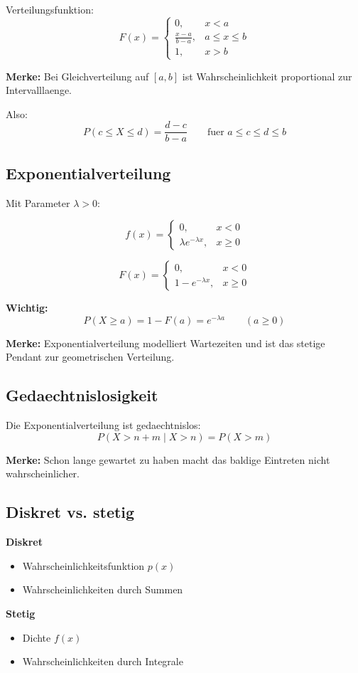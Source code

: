 \documentclass[a4paper,11pt]{article}
\begin{document}
Verteilungsfunktion:
\[
F(x)=
\begin{cases}
0,& x<a \\
\frac{x-a}{b-a},& a\le x\le b \\
1,& x>b
\end{cases}
\]

\textbf{Merke:}
Bei Gleichverteilung auf $[a,b]$ ist Wahrscheinlichkeit proportional zur Intervalllaenge.

Also:
\[
P(c\le X\le d)=\frac{d-c}{b-a}
\qquad \text{fuer } a\le c\le d\le b
\]

\subsection{Exponentialverteilung}
Mit Parameter $\lambda>0$:

\[
f(x)=
\begin{cases}
0,& x<0 \\
\lambda e^{-\lambda x},& x\ge 0
\end{cases}
\]

\[
F(x)=
\begin{cases}
0,& x<0 \\
1-e^{-\lambda x},& x\ge 0
\end{cases}
\]

\textbf{Wichtig:}
\[
P(X\ge a)=1-F(a)=e^{-\lambda a}
\qquad (a\ge 0)
\]

\textbf{Merke:}
Exponentialverteilung modelliert Wartezeiten und ist das stetige Pendant zur geometrischen Verteilung.

\subsection{Gedaechtnislosigkeit}
Die Exponentialverteilung ist gedaechtnislos:
\[
P(X>n+m\mid X>n)=P(X>m)
\]

\textbf{Merke:}
Schon lange gewartet zu haben macht das baldige Eintreten nicht wahrscheinlicher.

\subsection{Diskret vs. stetig}
\textbf{Diskret}
\begin{itemize}
  \item Wahrscheinlichkeitsfunktion $p(x)$
  \item Wahrscheinlichkeiten durch Summen
\end{itemize}

\textbf{Stetig}
\begin{itemize}
  \item Dichte $f(x)$
  \item Wahrscheinlichkeiten durch Integrale
\end{itemize}
\end{document}
